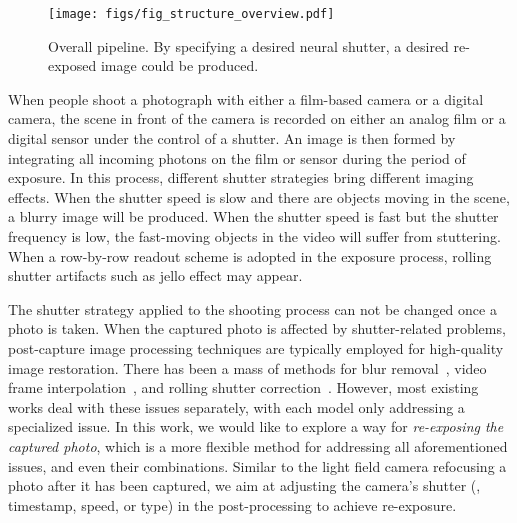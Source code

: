 \documentclass[10pt,twocolumn,letterpaper]{article}
\begin{document}
\begin{figure*}[h!]
	\centering
	\texttt{[image: figs/fig\_structure\_overview.pdf]}
	\caption{Overall pipeline. 
By specifying a desired neural shutter,   
a desired re-exposed image could be produced.
}
	\label{fig:structure_overview}
	\vspace{-1em}
\end{figure*}

When people shoot a photograph with either a film-based camera or a digital camera, the scene in front of the camera is recorded on either an analog film or a digital sensor under the control of a shutter. 
An image is then formed by integrating all incoming photons on the film or sensor during the period of exposure. 
In this process, different shutter strategies bring different imaging effects.
When the shutter speed is slow and there are objects moving in the scene, a blurry image will be produced. When the shutter speed is fast but the shutter frequency is low, the fast-moving objects in the video will suffer from stuttering. When a row-by-row readout scheme is adopted in the exposure process, rolling shutter artifacts such as jello effect may appear. 

The shutter strategy applied to the shooting process can not be changed once a photo is taken.
When the captured photo is affected by shutter-related problems, post-capture image processing techniques are typically employed for high-quality image restoration.
There has been a mass of methods for blur removal~\cite{DeblurSurvey, DeblurGAN, DeepDeblur}, video frame interpolation~\cite{DeblurSurvey, SloMo, DAIN}, and rolling shutter correction~\cite{DSUN, JCD}. 
{
}
However, most existing works deal with these issues separately, with each model only addressing a specialized issue. 
In this work, we would like to explore a way for \textit{re-exposing the captured photo}, which is a more flexible method for addressing all aforementioned issues, and even their combinations.
Similar to the light field camera refocusing a photo after it has been captured, we aim at adjusting the camera's shutter (\eg, timestamp, speed, or type) in the post-processing to achieve re-exposure.
\end{document}

